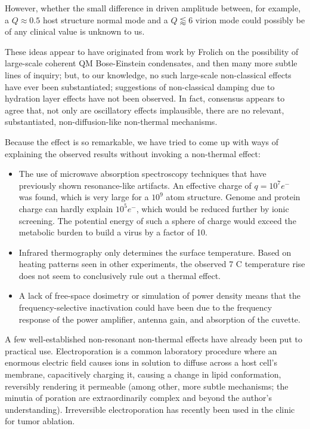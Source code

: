 \documentclass[paper.tex]{subfiles}
\begin{document}
However, whether the small difference in driven amplitude between, for example, a $Q\approx0.5$ host structure normal mode and a $Q\lessapprox6$ virion mode could possibly be of any clinical value is unknown to us. 



These ideas appear to have originated from work by Frolich\cite{Longrange1968}\cite{Evidence1983}\cite{Biological1980}\cite{Coherence1983} on the possibility of large-scale coherent QM Bose-Einstein condensates, and then many more subtle lines of inquiry\cite{Mechanisms1992}\cite{mechanisms1981}; but, to our knowledge, no such large-scale non-classical effects have ever been substantiated; suggestions of non-classical damping due to hydration layer effects have not been observed. In fact, consensus\cite{Exposure2009}\cite{ICNIRP2020}\cite{C95} appears to agree that, not only are oscillatory effects implausible, there are no relevant, substantiated, non-diffusion-like non-thermal mechanisms. 

Because the effect is so remarkable, we have tried to come up with ways of explaining the observed results without invoking a non-thermal effect:
\begin{itemize}
	\item The use of microwave absorption spectroscopy techniques that have previously shown resonance-like artifacts\cite{Resonances1987}. An effective charge of $q=10^7 e^-$ was found, which is very large for a $10^9$ atom structure.  Genome and protein charge can hardly explain $10^5 e^-$, which would be reduced further by ionic screening. The potential energy of such a sphere of charge would exceed the metabolic burden to build a virus by a factor of 10.
	\item Infrared thermography only determines the surface temperature. Based on heating patterns seen in other experiments\cite{Effects1950}, the observed 7 C temperature rise does not seem to conclusively rule out a thermal effect. 
	\item A lack of free-space dosimetry or simulation of power density means that the frequency-selective inactivation could have been due to the frequency response of the power amplifier, antenna gain, and absorption of the cuvette.
\end{itemize}


A few well-established non-resonant non-thermal effects have already been put to practical use. Electroporation is a common laboratory procedure where an enormous electric field causes ions in solution to diffuse across a host cell's membrane, capacitively charging it, causing a change in lipid conformation, reversibly rendering it permeable (among other, more subtle mechanisms; the minutia of poration are extraordinarily complex and beyond the author's understanding\cite{Theoretical2007}). Irreversible electroporation\cite{Irreversible2013} has recently been used in the clinic\cite{Nonthermal2013} for tumor ablation.%
\end{document}
